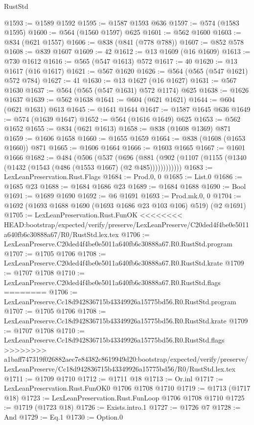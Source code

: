 \begin{lexlean}{RustStd}
\begin{coremodule}
{\begin{coremodule}
{{{{{{{{{{{{{@1593 := @1589 @1592
@1595 := @1587 @1593 @636
@1597 := @574 (@1583 @1595)
@1600 := @564 (@1560 @1597) @625
@1601 := @562 @1600
@1603 := @834 (@621 @1557)
@1606 := @838 (@841 (@778 @788))
@1607 := @852 @578
@1608 := @839 @1607
@1609 := 42
@1612 := @13 @1609 (@16 @1609)
@1613 := @730 @1612
@1616 := @565 (@547 @1613) @572
@1617 := 40
@1620 := @13 @1617 (@16 @1617)
@1621 := @567 @1620
@1626 := @564 (@565 (@547 @1621) @572 @784)
@1627 := 41
@1630 := @13 @1627 (@16 @1627)
@1631 := @567 @1630
@1637 := @564 (@565 (@547 @1631) @572 @1174) @625
@1638 := @1626 @1637
@1639 := @562 @1638
@1641 := @604 (@621 @1621)
@1644 := @604 (@621 @1631) @613
@1645 := @1641 @1644
@1647 := @1587 @1645 @636
@1649 := @574 (@1639 @1647)
@1652 := @564 (@1616 @1649) @625
@1653 := @562 @1652
@1655 := @834 (@621 @1613)
@1658 := @838 (@1608 @1369) @871
@1659 := @1606 @1658
@1660 := @1655 @1659
@1664 := @838 (@1608 (@1653 @1660)) @871
@1665 := @1606 @1664
@1666 := @1603 @1665
@1667 := @1601 @1666
@1682 := @484
    (@506
      (@537
        (@696
          (@881 (@902 (@1107 (@1155 (@1340 (@1432 (@1543 (@486 (@1553 @1667) (@2 @485))))))))))))
@1683 := LexLeanPreservation.Rust.Flags
@1684 := Prod.{0, 0}
@1685 := List.{0}
@1686 := @1685 @23
@1688 := @1684 @1686 @23
@1689 := @1684 @1688
@1690 := Bool
@1691 := @1689 @1690
@1692 := @6 @1691
@1693 := Prod.mk.{0, 0}
@1704 := @1692 (@1693 @1688 @1690 (@1693 @1686 @23 @103 @106) @519) (@2 @1691)
@1705 := LexLeanPreservation.Rust.FunOK
<<<<<<<< HEAD:bootstrap/expected/verify/preserve/LexLeanPreserve/C20ded4f4be0e5011a640fb6c30888a67/R0/RustStd.lex.tex
@1706 := LexLeanPreserve.C20ded4f4be0e5011a640fb6c30888a67.R0.RustStd.program
@1707 := @1705 @1706
@1708 := LexLeanPreserve.C20ded4f4be0e5011a640fb6c30888a67.R0.RustStd.krate
@1709 := @1707 @1708
@1710 := LexLeanPreserve.C20ded4f4be0e5011a640fb6c30888a67.R0.RustStd.flags
========
@1706 := LexLeanPreserve.Cc18d942836715b43349926a15775bd56.R0.RustStd.program
@1707 := @1705 @1706
@1708 := LexLeanPreserve.Cc18d942836715b43349926a15775bd56.R0.RustStd.krate
@1709 := @1707 @1708
@1710 := LexLeanPreserve.Cc18d942836715b43349926a15775bd56.R0.RustStd.flags
>>>>>>>> a1baff747319f026882aec7e84382c8619949d20:bootstrap/expected/verify/preserve/LexLeanPreserve/Cc18d942836715b43349926a15775bd56/R0/RustStd.lex.tex
@1711 := @1709 @1710
@1712 := @1711 @18
@1713 := Or.inl
@1717 := LexLeanPreservation.Rust.FunOK0 @1706 @1708 @1710
@1719 := @1713 (@1717 @18)
@1723 := LexLeanPreservation.Rust.FunLoop @1706 @1708 @1710
@1725 := @1719 (@1723 @18)
@1726 := Exists.intro.{1}
@1727 := @1726 @7
@1728 := And
@1729 := Eq.{1}
@1730 := Option.{0}
}}}}}}}}}}}}}
\end{coremodule}}
\end{coremodule}
\end{lexlean}
